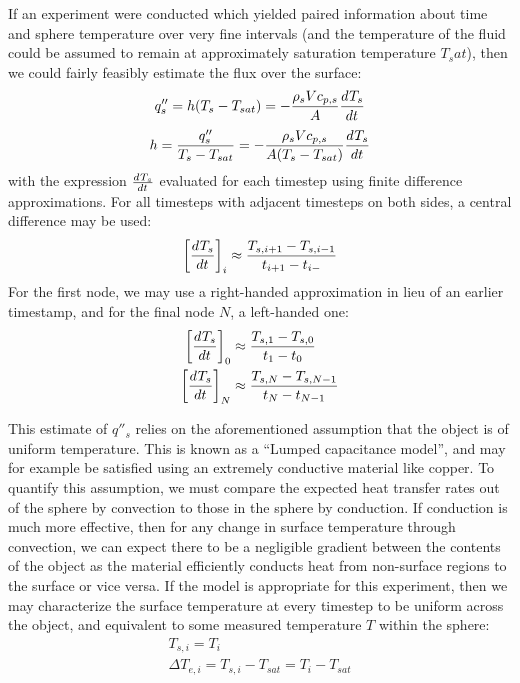 \documentclass[12pt]{article}
\begin{document}
If an experiment were conducted which yielded paired information about time and sphere temperature over very fine intervals (and the temperature of the fluid could be assumed to remain at approximately saturation temperature $T_sat$), then we could fairly feasibly estimate the flux over the surface:
\begin{equation}
    q''_s=h(T_s-T_{sat})=-\frac{\rho_s V c_{p,s}}{A}\frac{d^{}T_s}{d{t}^{}}
    \label{eq:q_experimental}
\end{equation}
\begin{equation}
    h=\frac{q''_s}{T_s-T_{sat}}=-\frac{\rho_s V c_{p,s}}{A(T_s-T_{sat})}\frac{d^{}T_s}{d{t}^{}}
    \label{eq:h_experimental}
\end{equation}
with the expression $\frac{d^{}T_s}{d{t}^{}}$ evaluated for each timestep using finite difference approximations.
For all timesteps with adjacent timesteps on both sides, a central difference may be used:
\newcommand{\dTdt}{\deriv{T_s}{t}{}}
\begin{equation}
    \left[\dTdt\right]_i\approx\frac{T_{s,i+1}-T_{s,i-1}}{t_{i+1}-t_{i-}}
    \label{eq:diff_center}
\end{equation}
For the first node, we may use a right-handed approximation in lieu of an earlier timestamp, and for the final node $N$, a left-handed one:
\begin{equation}
    \begin{aligned}
        \left[\dTdt\right]_0 &\approx\frac{T_{s,1}-T_{s,0}}{t_{1}-t_{0}}\\
        \left[\dTdt\right]_N &\approx\frac{T_{s,N}-T_{s,N-1}}{t_{N}-t_{N-1}}
        \label{eq:diff_edge}
    \end{aligned}
\end{equation}

This estimate of $q''_s$ relies on the aforementioned assumption that the object is of uniform temperature.
This is known as a ``Lumped capacitance model'', and may for example be satisfied using an extremely conductive material like copper.
To quantify this assumption, we must compare the expected heat transfer rates out of the sphere by convection to those in the sphere by conduction.
If conduction is much more effective, then for any change in surface temperature through convection, we can expect there to be a negligible gradient between the contents of the object as the material efficiently conducts heat from non-surface regions to the surface or vice versa.
If the model is appropriate for this experiment, then we may characterize the surface temperature at every timestep to be uniform across the object, and equivalent to some measured temperature $T$ within the sphere:
\begin{equation}
    \begin{gathered}
        T_{s,i}=T_i\\
        \Delta T_{e,i} = T_{s,i}-T_{sat}=T_i-T_{sat}
    \end{gathered}
\end{equation}
\end{document}
